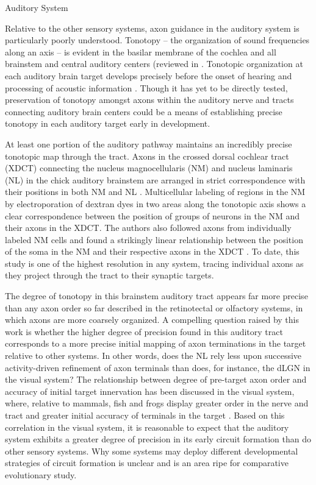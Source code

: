 Auditory System

Relative to the other sensory systems, axon guidance in the auditory system is particularly poorly understood. 
Tonotopy – the organization of sound frequencies along an axis – is evident in the basilar membrane of the cochlea and all brainstem and central auditory centers (reviewed in \cite{appler2011connecting}. 
Tonotopic organization at each auditory brain target develops precisely before the onset of hearing and processing of acoustic information \cite{appler2011connecting, rubel2002auditory}. 
Though it has yet to be directly tested, preservation of tonotopy amongst axons within the auditory nerve and tracts connecting auditory brain centers could be a means of establishing precise tonotopy in each auditory target early in development. 

At least one portion of the auditory pathway maintains an incredibly precise tonotopic map through the tract. 
Axons in the crossed dorsal cochlear tract (XDCT) connecting the nucleus magnocellularis (NM) and nucleus laminaris (NL) in the chick auditory brainstem are arranged in strict correspondence with their positions in both NM and NL \cite{kashima2013pre}. 
Multicellular labeling of regions in the NM by electroporation of dextran dyes in two areas along the tonotopic axis shows a clear correspondence between the position of groups of neurons in the NM and their axons in the XDCT. 
The authors also followed axons from individually labeled NM cells and found a strikingly linear relationship between the position of the soma in the NM and their respective axons in the XDCT \cite{kashima2013pre}. 
To date, this study is one of the highest resolution in any system, tracing individual axons as they project through the tract to their synaptic targets. 

The degree of tonotopy in this brainstem auditory tract appears far more precise than any axon order so far described in the retinotectal or olfactory systems, in which axons are more coarsely organized. 
A compelling question raised by this work is whether the higher degree of precision found in this auditory tract corresponds to a more precise initial mapping of axon terminations in the target relative to other systems. 
In other words, does the NL rely less upon successive activity-driven refinement of axon terminals than does, for instance, the dLGN in the visual system? 
The relationship between degree of pre-target axon order and accuracy of initial target innervation has been discussed in the visual system, where, relative to mammals, fish and frogs display greater order in the nerve and tract and greater initial accuracy of terminals in the target \cite{simon1991relationship}. 
Based on this correlation in the visual system, it is reasonable to expect that the auditory system exhibits a greater degree of precision in its early circuit formation than do other sensory systems. 
Why some systems may deploy different developmental strategies of circuit formation is unclear and is an area ripe for comparative evolutionary study. 